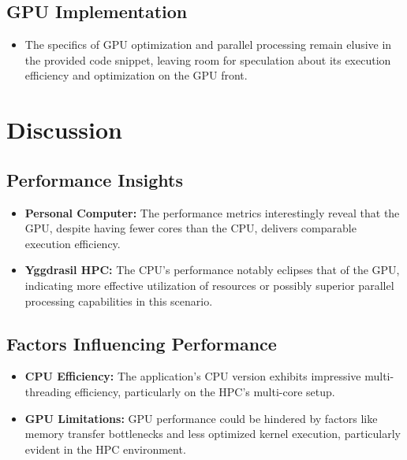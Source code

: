\hypertarget{gpu-implementation}{%
\subsection{GPU Implementation}\label{gpu-implementation}}

\begin{itemize}
\tightlist
\item
  The specifics of GPU optimization and parallel processing remain
  elusive in the provided code snippet, leaving room for speculation
  about its execution efficiency and optimization on the GPU front.
\end{itemize}

\hypertarget{discussion}{%
\section{Discussion}\label{discussion}}

\hypertarget{performance-insights}{%
\subsection{Performance Insights}\label{performance-insights}}

\begin{itemize}
\tightlist
\item
  \textbf{Personal Computer:} The performance metrics interestingly
  reveal that the GPU, despite having fewer cores than the CPU, delivers
  comparable execution efficiency.
\item
  \textbf{Yggdrasil HPC:} The CPU's performance notably eclipses that of
  the GPU, indicating more effective utilization of resources or
  possibly superior parallel processing capabilities in this scenario.
\end{itemize}

\hypertarget{factors-influencing-performance}{%
\subsection{Factors Influencing
Performance}\label{factors-influencing-performance}}

\begin{itemize}
\tightlist
\item
  \textbf{CPU Efficiency:} The application's CPU version exhibits
  impressive multi-threading efficiency, particularly on the HPC's
  multi-core setup.
\item
  \textbf{GPU Limitations:} GPU performance could be hindered by factors
  like memory transfer bottlenecks and less optimized kernel execution,
  particularly evident in the HPC environment.
\end{itemize}

